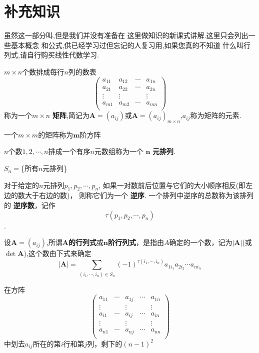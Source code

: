 \part{补充知识}

虽然这一部分叫,但是我们并没有准备在
这里做知识的新课式讲解.这里只会列出一些基本概念
和公式,供已经学习过但忘记的人复习用,如果您真的不知道
什么叫行列式,请自行购买线性代数学习.

 $m\times n$个数排成每行$n$列的数表
$$\left(
  \begin{array}{cccc}
    a_{11} & a_{12} & \cdots & a_{1n} \\
    a_{21} & a_{22} & \cdots & a_{2n} \\
    \vdots & \vdots &  & \vdots \\
    a_{m1} & a_{m2} & \cdots & a_{mn} \\
  \end{array}
\right)$$
称为一个$m\times n$ \textbf{矩阵},简记为$\bm{A}=(a_{ij})$或$\bm{A}=(a_{ij})_{m\times n}$,$a_{ij}$称为矩阵的元素.

 一个$m\times m$的矩阵称为$\bm{m}$阶方阵

 $n$个数$1,2,\cdots,n$排成一个有序$n$元数组称为一个 $\bm{n}$ \textbf{元排列}.

 $S_n=$\{所有$n$元排列\}

 对于给定的$n$元排列$p_1,p_2,\cdots,p_n$,
如果一对数前后位置与它们的大小顺序相反(即左边的数大于右边的数)，
则称它们为一个 \textbf{逆序}.
一个排列中逆序的总数称为该排列的 \textbf{逆序数}，记作$$\tau(p_1,p_2,\cdots,p_n)$$.

 设$\bm{A}=(a_{ij})$,所谓$\bm{A}$\textbf{的行列式}或$\bm{n}$\textbf{阶行列式}，是指由$A$确定的一个数，记为$\left | \bm{A} \right |$(或$\det \bm{A}$),这个数由下式来确定
$$
\left | \bm{A} \right |=\sum_{(i_1,\cdots,i_n)\in S_n}{(-1)^{\tau(i_1,\cdots,i_n)}a_{1i_1}a_{2i_2}\cdots a_{ni_n}}
$$

 在方阵
$$
\left(
  \begin{array}{ccccc}
    a_{11} & \cdots & a_{1j} & \cdots & a_{1n} \\
    \vdots &  & \vdots &  & \vdots \\
    a_{i1} & \cdots & a_{ij} & \cdots & a_{in} \\
    \vdots &  & \vdots &  & \vdots \\
    a_{n1} & \cdots & a_{nj} & \cdots & a_{nn} \\
  \end{array}
\right)
$$
中划去$a_{ij}$所在的第$i$行和第$j$列，剩下的$(n-1)^{2}$

